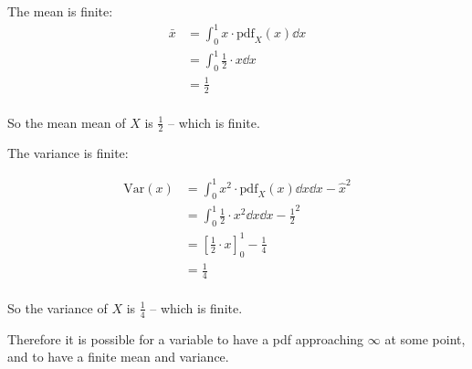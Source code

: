 \documentclass[10pt,\jkfside,a4paper]{article}
\begin{document}
\begin{enumerate}[label=\arabic*]
The mean is finite:
\[
\begin{split}
\bar{x} &= \int^1_0 x \cdot \text{pdf}_X(x) \dd{x} \\
&= \int^1_0 \frac{1}{2} \cdot x \dd{x} \\
&= \frac{1}{2} \\
\end{split}
\]

So the mean mean of $X$ is $\frac{1}{2}$ -- which is finite.

The variance is finite:

\[
\begin{split}
\text{Var}(x) &= \int^1_0 x^2 \cdot \text{pdf}_X(x) \dd{x} \dd{x} - \hat{x}^2 \\
&= \int^1_0 \frac{1}{2} \cdot x^2 \dd{x} \dd{x} - \frac{1}{2}^2 \\
&= \left[ \frac{1}{2} \cdot x \right]^1_0 - \frac{1}{4} \\
&= \frac{1}{4} \\
\end{split}
\]

So the variance of $X$ is $\frac{1}{4}$ -- which is finite.

Therefore it is possible for a variable to have a pdf approaching $\infty$
at some point, and to have a finite mean and variance.

\end{enumerate}
\end{document}
